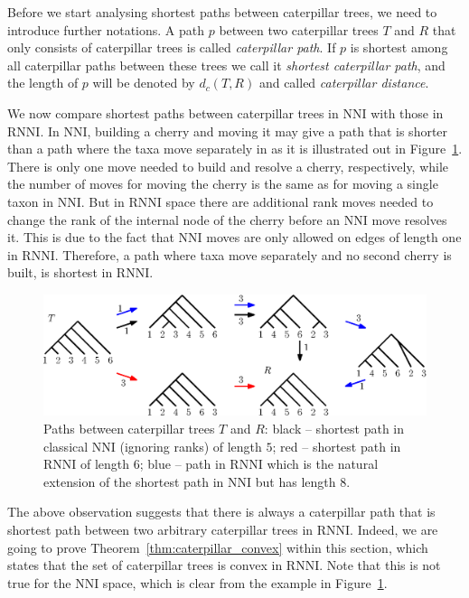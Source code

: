 \documentclass{amsart}
\newcommand{\nni}{\mathrm{NNI}}
\newcommand{\rnni}{\mathrm{RNNI}}
\begin{document}
Before we start analysing shortest paths between caterpillar trees, we need to introduce further notations.
A path $p$ between two caterpillar trees $T$ and $R$ that only consists of caterpillar trees is called \emph{caterpillar path}.
If $p$ is shortest among all caterpillar paths between these trees we call it \emph{shortest caterpillar path}, and the length of $p$ will be denoted by $d_c(T,R)$ and called \emph{caterpillar distance}.

We now compare shortest paths between caterpillar trees in $\nni$ with those in $\rnni$.
In $\nni$, building a cherry and moving it may give a path that is shorter than a path where the taxa move separately in as it is illustrated out in Figure~\ref{fig:NNI_vs_RNNI}.
There is only one move needed to build and resolve a cherry, respectively, while the number of moves for moving the cherry is the same as for moving a single taxon in $\nni$.
But in $\rnni$ space there are additional rank moves needed to change the rank of the internal node of the cherry before an $\nni$ move resolves it.
This is due to the fact that $\nni$ moves are only allowed on edges of length one in $\rnni$.
Therefore, a path where taxa move separately and no second cherry is built, is shortest in $\rnni$.

\begin{figure}[H]
	\centering
	\includegraphics[width=\textwidth]{NNI_vs_RNNI}
	\caption{Paths between caterpillar trees $T$ and $R$: black -- shortest path in classical $\nni$ (ignoring ranks) of length $5$; red -- shortest path in $\rnni$ of length $6$; blue -- path in $\rnni$ which is the natural extension of the shortest path in $\nni$ but has length $8$.}
	\label{fig:NNI_vs_RNNI}
\end{figure}

The above observation suggests that there is always a caterpillar path that is shortest path between two arbitrary caterpillar trees in $\rnni$.
Indeed, we are going to prove Theorem~\ref{thm:caterpillar_convex} within this section, which states that the set of caterpillar trees is convex in $\rnni$.
Note that this is not true for the $\nni$ space, which is clear from the example in Figure~\ref{fig:NNI_vs_RNNI}.
\end{document}
